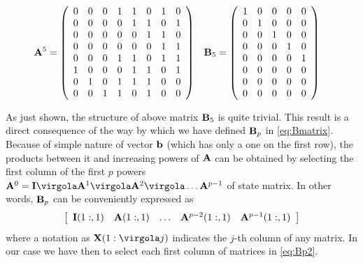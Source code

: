 \begin{align} \label{eq:triex}
\mathbf{A}^5 & =
\left( \begin{array}{cccccccc}
 0 &  0 &  0 &  1 &  1 &  0 &  1 & 0 \\
 0 &  0 &  0 &  0 &  1 &  1 &  0 & 1 \\
 0 &  0 &  0 &  0 &  0 &  1 &  1 & 0 \\
 0 &  0 &  0 &  0 &  0 &  0 &  1 & 1 \\
 0 &  0 &  0 &  1 &  1 &  0 &  1 & 1 \\
 1 &  0 &  0 &  0 &  1 &  1 &  0 & 1 \\
 0 &  1 &  0 &  1 &  1 &  1 &  0 & 0 \\
 0 &  0 &  1 &  1 &  0 &  1 &  0 & 0 \\
\end{array}\right) &
\mathbf{B}_5 & = \left(
\begin{array}{ccccc}
 1 &  0 &  0 &  0 & 0 \\
 0 &  1 &  0 &  0 & 0 \\
 0 &  0 &  1 &  0 & 0 \\
 0 &  0 &  0 &  1 & 0 \\
 0 &  0 &  0 &  0 & 1 \\
 0 &  0 &  0 &  0 & 0 \\
 0 &  0 &  0 &  0 & 0 \\
 0 &  0 &  0 &  0 & 0 \\
\end{array}
\right)
\end{align}

As just shown, the structure of above matrix $\mathbf{B}_5$ is quite trivial. This result is a direct consequence of the way by which we have defined $\mathbf{B}_p$ in \eqref{eq:Bmatrix}. Because of simple nature of vector $\mathbf{b}$ (which has only a one on the first row), the products between it and increasing powers of $\mathbf{A}$ can be obtained by selecting the first column of the first $p$ powers \( \vet A^0= \vet I \virgola \vet A^1 \virgola \vet A^2 \virgola \ldots \vet A^{p-1} \) of state matrix. In other words, $\mathbf{B}_p$ can be conveniently expressed as
\begin{equation}\label{eq:Bp2}
\left[
\begin{array}{ccccc}
  \mathbf{I}(1:,1) & \mathbf{A}(1:,1) & \ldots & {\mathbf{A}}^{p-2}(1:,1) &  \mathbf{A}^{p-1}(1:,1)
\end{array}
\right]
\end{equation}
where a notation as \( \vet X(1: \virgola j) \) indicates the \(j\)-th column of any matrix.  In our case we have then to select each first column of matrices in \eqref{eq:Bp2}.

